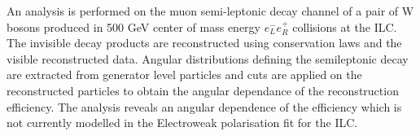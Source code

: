 An analysis is performed on the muon semi-leptonic decay channel of a pair of W bosons produced in 500 GeV center of mass energy ${e}_{L}^{-}{e}_{R}^{+}$ collisions at the ILC. The invisible decay products are reconstructed using conservation laws and the visible reconstructed data. Angular distributions defining the semileptonic decay are extracted from generator level particles and cuts are applied on the reconstructed particles to obtain the angular dependance of the reconstruction efficiency. The analysis reveals an angular dependence of the efficiency which is not currently modelled in the Electroweak polarisation fit for the ILC. 
